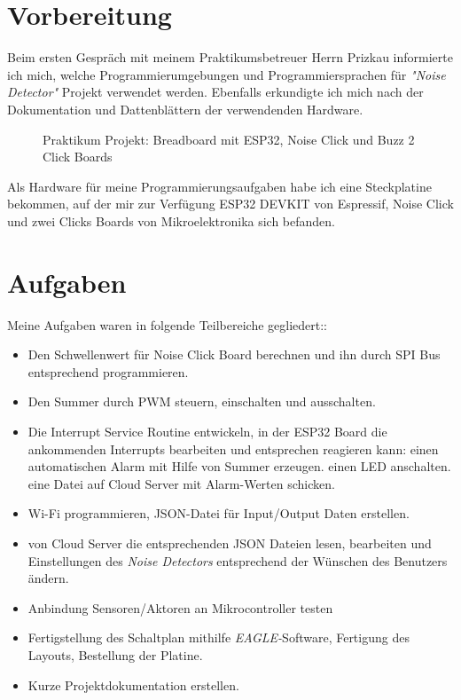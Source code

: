 \section{Vorbereitung}
\label{sec:main:preparation}
Beim ersten Gespräch mit meinem Praktikumsbetreuer Herrn Prizkau informierte ich mich, welche Programmierumgebungen und Programmiersprachen für \textit{"Noise Detector"} Projekt verwendet werden.
Ebenfalls erkundigte ich mich nach der Dokumentation und Dattenblättern der verwendenden Hardware.
\begin{figure}[!hb]
	\centering
	\caption[Praktikum Projekt]{Praktikum Projekt: Breadboard mit ESP32, Noise Click und Buzz 2 Click Boards}
	\label{fig:breadboard}
\end{figure}
Als Hardware für meine Programmierungsaufgaben habe ich eine Steckplatine bekommen, auf der mir zur Verfügung ESP32 DEVKIT von Espressif, Noise Click und zwei Clicks Boards von Mikroelektronika sich befanden.

\section{Aufgaben}
Meine Aufgaben waren in folgende Teilbereiche gegliedert:: 
\begin{itemize}
	\item Den Schwellenwert für Noise Click Board berechnen und ihn durch SPI Bus entsprechend programmieren. 
	\item Den Summer durch PWM steuern, einschalten und ausschalten.{\normalsize }
	\item Die Interrupt Service Routine entwickeln, in der ESP32 Board die ankommenden Interrupts bearbeiten und entsprechen reagieren kann:
	\subitem * einen automatischen Alarm mit Hilfe von Summer erzeugen.
	\subitem * einen LED anschalten.
	\subitem * eine Datei auf Cloud Server mit Alarm-Werten schicken.
	\item Wi-Fi  programmieren, JSON-Datei für Input/Output Daten erstellen.
	\item von Cloud Server die entsprechenden JSON Dateien lesen, bearbeiten und Einstellungen des \textit{Noise Detectors} entsprechend der Wünschen des Benutzers ändern.
	\item Anbindung Sensoren/Aktoren an Mikrocontroller testen
	\item Fertigstellung des Schaltplan mithilfe \textit{EAGLE-}Software, Fertigung des Layouts, Bestellung der Platine.
	\item Kurze Projektdokumentation erstellen.	
\end{itemize}

